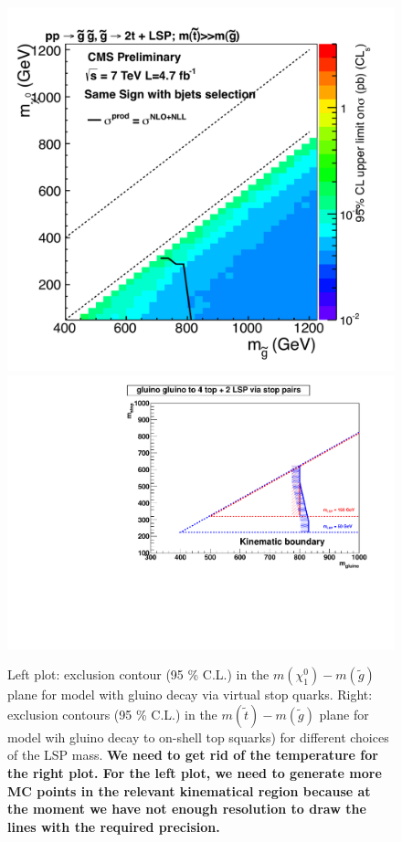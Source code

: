\begin{figure}[bht]
\begin{center}
\includegraphics[width=0.49\linewidth]{figs/T1tttt.pdf}
\includegraphics[width=0.49\linewidth]{figs/gluinoStop_fkw}
\caption{Left plot: exclusion contour (95 \% C.L.) in the 
$m(\chi^0_1)-m(\widetilde{g})$ 
plane for model with gluino decay via virtual stop quarks.
Right: exclusion contours (95 \% C.L.) in the 
$m(\widetilde{t})-m(\widetilde{g})$
plane for model wih gluino decay to on-shell top squarks)
for different choices of the LSP mass.  
{\bf We need to get rid of the temperature for the
right plot.  For the left plot, 
we need to generate more MC points in the relevant kinematical
region because at the moment we have not enough resolution to 
draw the lines with the required precision.}
\label{fig:stoppaper}}
\end{center}
\end{figure}


